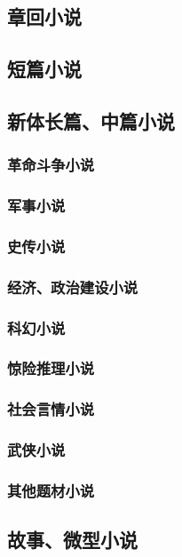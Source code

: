 \documentclass[UTF8]{../../RepresentationUniverse}
\begin{document}
    \subsection{章回小说}
    \subsection{短篇小说}
    \subsection{新体长篇、中篇小说}
        \subsubsection{革命斗争小说}
        \subsubsection{军事小说}
        \subsubsection{史传小说}
        \subsubsection{经济、政治建设小说}
        \subsubsection{科幻小说}
        \subsubsection{惊险推理小说}
        \subsubsection{社会言情小说}
        \subsubsection{武侠小说}
        \subsubsection{其他题材小说}
    \subsection{故事、微型小说}
\end{document}
